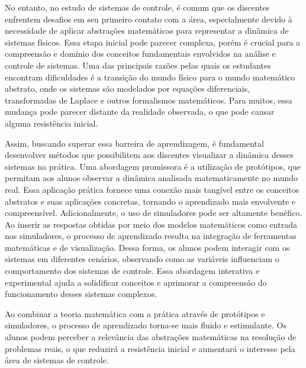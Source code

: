 No entanto, no estudo de sistemas de controle, é comum que os discentes enfrentem desafios em seu primeiro contato com a área, especialmente devido à necessidade de aplicar abstrações matemáticas para representar a dinâmica de sistemas físicos. Essa etapa inicial pode parecer complexa, porém é crucial para a compreensão e domínio dos conceitos fundamentais envolvidos na análise e controle de sistemas. Uma das principais razões pelas quais os estudantes encontram dificuldades é a transição do mundo físico para o mundo matemático abstrato, onde os sistemas são modelados por equações diferenciais, transformadas de Laplace e outros formalismos matemáticos. Para muitos, essa mudança pode parecer distante da realidade observada, o que pode causar alguma resistência inicial.

Assim, buscando superar essa barreira de aprendizagem, é fundamental desenvolver métodos que possibilitem aos discentes visualizar a dinâmica desses sistemas na prática. Uma abordagem promissora é a utilização de protótipos, que permitam aos alunos observar a dinâmica analisada matematicamente no mundo real. Essa aplicação prática fornece uma conexão mais tangível entre os conceitos abstratos e suas aplicações concretas, tornando o aprendizado mais envolvente e compreensível. Adicionalmente, o uso de simuladores pode ser altamente benéfico. Ao inserir as respostas obtidas por meio dos modelos matemáticos como entrada nos simuladores, o processo de aprendizado resulta na integração de ferramentas matemáticas e de visualização. Dessa forma, os alunos podem interagir com os sistemas em diferentes cenários, observando como as variáveis influenciam o comportamento dos sistemas de controle. Essa abordagem interativa e experimental ajuda a solidificar conceitos e aprimorar a compreensão do funcionamento desses sistemas complexos.

Ao combinar a teoria matemática com a prática através de protótipos e simuladores, o processo de aprendizado torna-se mais fluido e estimulante. Os alunos podem perceber a relevância das abstrações matemáticas na resolução de problemas reais, o que reduzirá a resistência inicial e aumentará o interesse pela área de sistemas de controle.


